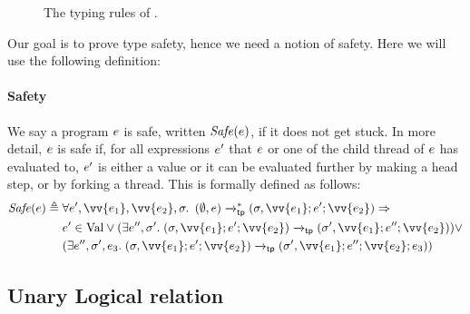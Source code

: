 \begin{figure}
\caption{The typing rules of \TheLang{}.}
\label{fig:logrel-iris-typing-rules}
\end{figure}

Our goal is to prove type safety, hence we need a notion of safety. Here we will use the following definition:

\paragraph{Safety} We say a program $e$ is safe, written
$\mathit{Safe}(e)$, if it does not get stuck.
In more detail, $e$ is safe if, for all expressions $e'$ that $e$ or one
of the child thread of $e$ has evaluated to, $e'$ is either a value or it
can be evaluated further by making a head step, or by forking a thread.
This is formally defined as follows:
\begin{align*}
  \SAFE(\expr) \eqdef{}
  & \All \expr', \vv{\expr_1}, \vv{\expr_2}, \state.\; (\emptyset,
    \expr) \tpstep ^{*} (\state, \vv{\expr_1};\expr';\vv{\expr_2}) \Rightarrow \\
  & \expr' \in \Val \lor (\exists \expr'', \state'.\; (\state, \vv{\expr_1};\expr';\vv{\expr_2})
    \tpstep (\state', \vv{\expr_1};\expr'';\vv{\expr_2})) \lor \\
  & (\exists \expr'', \state', \expr_3.\; (\state, \vv{\expr_1};\expr'; \vv{\expr_2})
    \tpstep (\state', \vv{\expr_1};\expr'';\vv{\expr_2}; \expr_3))
\end{align*}


\subsection{Unary Logical relation}
\label{sec:unary-logical-relation}

